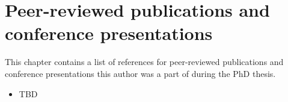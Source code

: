 \chapter{Peer-reviewed publications and conference presentations}

This chapter contains a list of references for peer-reviewed publications and conference presentations this author was a part of during the PhD thesis.
\begin{itemize}
\item TBD
\end{itemize}
